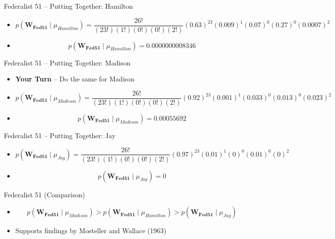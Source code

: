 \documentclass[
  ignorenonframetext,
  aspectratio=169]{beamer}
\begin{document}
\begin{frame}{Federalist 51 -- Putting Together: Hamilton}
\label{federalist-51-putting-together-hamilton}
\begin{itemize}
\item[] $$
p(\mathbf{W_{Fed51}}\mid\mu_{Hamilton}) = \frac{26!}{(23!)(1!)(0!)(0!)(2!)}(0.63)^{23}(0.009)^{1}(0.07)^{0}(0.27)^{0}(0.0007)^{2}
$$ \par \vspace{5mm} \pause

\item[] $$
p(\mathbf{W_{Fed51}}\mid\mu_{Hamilton}) = 0.0000000008346
$$
\end{itemize}
\end{frame}

\begin{frame}{Federalist 51 -- Putting Together: Madison}
\label{federalist-51-putting-together-madison}
\begin{itemize}
\item \textbf{Your Turn} -- Do the same for Madison \par \vspace{2.5mm} \pause
\item[] $$p(\mathbf{W_{Fed51}}\mid\mu_{Madison}) = \frac{26!}{(23!)(1!)(0!)(0!)(2!)}(0.92)^{23}(0.001)^{1}(0.033)^{0}(0.013)^{0}(0.023)^{2}$$ 
\item[] $$
p(\mathbf{W_{Fed51}}\mid\mu_{Madison}) = 0.00055692
$$
\end{itemize}
\end{frame}

\begin{frame}{Federalist 51 -- Putting Together: Jay}
\label{federalist-51-putting-together-jay}
\begin{itemize}
\item[] $$
p(\mathbf{W_{Fed51}}\mid\mu_{Jay}) = \frac{26!}{(23!)(1!)(0!)(0!)(2!)}(0.97)^{23}(0.01)^{1}(0)^{0}(0.01)^{0}(0)^{2}
$$

\item[] $$
p(\mathbf{W_{Fed51}}\mid\mu_{Jay}) = 0
$$
\end{itemize}
\end{frame}

\begin{frame}{Federalist 51 (Comparison)}
\label{federalist-51-comparison}
\begin{itemize}
\item[] $$p(\mathbf{W_{Fed51}}\mid\mu_{Madison}) > p(\mathbf{W_{Fed51}}\mid\mu_{Hamilton})  > p(\mathbf{W_{Fed51}}\mid\mu_{Jay}) $$ \par \vspace{2.5mm}
\item Supports findings by Mosteller and Wallace (1963) 
\end{itemize}
\end{frame}
\end{document}
